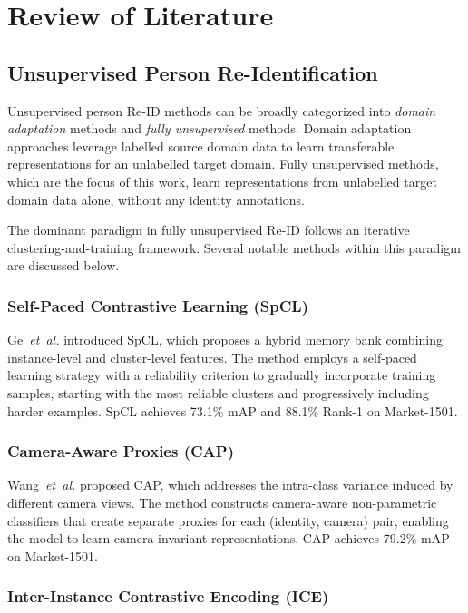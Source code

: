 \chapter{Review of Literature}

\section{Unsupervised Person Re-Identification}

Unsupervised person Re-ID methods can be broadly categorized into \textit{domain adaptation} methods and \textit{fully unsupervised} methods. Domain adaptation approaches \cite{zheng2017unlabeled} leverage labelled source domain data to learn transferable representations for an unlabelled target domain. Fully unsupervised methods, which are the focus of this work, learn representations from unlabelled target domain data alone, without any identity annotations.

The dominant paradigm in fully unsupervised Re-ID follows an iterative clustering-and-training framework. Several notable methods within this paradigm are discussed below.

\subsection{Self-Paced Contrastive Learning (SpCL)}

Ge~\textit{et~al.} \cite{ge2020selfpaced} introduced SpCL, which proposes a hybrid memory bank combining instance-level and cluster-level features. The method employs a self-paced learning strategy with a reliability criterion to gradually incorporate training samples, starting with the most reliable clusters and progressively including harder examples. SpCL achieves 73.1\% mAP and 88.1\% Rank-1 on Market-1501.

\subsection{Camera-Aware Proxies (CAP)}

Wang~\textit{et~al.} \cite{wang2021cap} proposed CAP, which addresses the intra-class variance induced by different camera views. The method constructs camera-aware non-parametric classifiers that create separate proxies for each (identity, camera) pair, enabling the model to learn camera-invariant representations. CAP achieves 79.2\% mAP on Market-1501.

\subsection{Inter-Instance Contrastive Encoding (ICE)}

